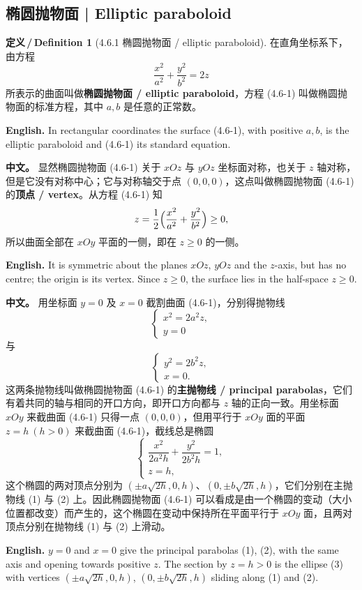 \documentclass[UTF8,11pt,a4paper]{ctexart}
\newcommand{\APS}[2]{\par\noindent\textbf{中文。} #1\par\noindent\textbf{English.} #2\par\smallskip}
\newcommand{\EN}[1]{\par\noindent \textbf{English.} #1\par}
\theoremstyle{definition}
\newtheorem*{definition}{定义\,/\,Definition}
\begin{document}
\subsection{椭圆抛物面 | Elliptic paraboloid}
\begin{definition}[4.6.1 椭圆抛物面 / elliptic paraboloid]\label{def:ell-parab}
在直角坐标系下，由方程
\[
\frac{x^2}{a^2}+\frac{y^2}{b^2}=2z\tag{4.6-1}
\]
所表示的曲面叫做\textbf{椭圆抛物面 / elliptic paraboloid}，方程 (4.6-1) 叫做椭圆抛物面的标准方程，其中 $a,b$ 是任意的正常数。
\EN{In rectangular coordinates the surface (4.6-1), with positive $a,b$, is the elliptic paraboloid and (4.6-1) its standard equation.}
\end{definition}

\APS{显然椭圆抛物面 (4.6-1) 关于 $xOz$ 与 $yOz$ 坐标面对称，也关于 $z$ 轴对称，但是它没有对称中心；它与对称轴交于点 $(0,0,0)$，这点叫做椭圆抛物面 (4.6-1) 的\textbf{顶点 / vertex}。从方程 (4.6-1) 知
\[
z=\frac12\Bigl(\frac{x^2}{a^2}+\frac{y^2}{b^2}\Bigr)\ge 0,
\]
所以曲面全部在 $xOy$ 平面的一侧，即在 $z\ge 0$ 的一侧。}{It is symmetric about the planes $xOz$, $yOz$ and the $z$-axis, but has no centre; the origin is its vertex. Since $z\ge0$, the surface lies in the half-space $z\ge0$.}

\APS{用坐标面 $y=0$ 及 $x=0$ 截割曲面 (4.6-1)，分别得抛物线
\[
\begin{cases}x^2=2a^2z,\\ y=0\end{cases}\tag{1}
\]
与
\[
\begin{cases}y^2=2b^2z,\\ x=0.\end{cases}\tag{2}
\]
这两条抛物线叫做椭圆抛物面 (4.6-1) 的\textbf{主抛物线 / principal parabolas}，它们有着共同的轴与相同的开口方向，即开口方向都与 $z$ 轴的正向一致。用坐标面 $xOy$ 来截曲面 (4.6-1) 只得一点 $(0,0,0)$，但用平行于 $xOy$ 面的平面 $z=h\ (h>0)$ 来截曲面 (4.6-1)，截线总是椭圆
\[
\begin{cases}\dfrac{x^2}{2a^2h}+\dfrac{y^2}{2b^2h}=1,\\ z=h,\end{cases}\tag{3}
\]
这个椭圆的两对顶点分别为 $(\pm a\sqrt{2h},0,h)$、$(0,\pm b\sqrt{2h},h)$，它们分别在主抛物线 (1) 与 (2) 上。因此椭圆抛物面 (4.6-1) 可以看成是由一个椭圆的变动（大小位置都改变）而产生的，这个椭圆在变动中保持所在平面平行于 $xOy$ 面，且两对顶点分别在抛物线 (1) 与 (2) 上滑动。}{$y=0$ and $x=0$ give the principal parabolas (1), (2), with the same axis and opening towards positive $z$. The section by $z=h>0$ is the ellipse (3) with vertices $(\pm a\sqrt{2h},0,h)$, $(0,\pm b\sqrt{2h},h)$ sliding along (1) and (2).}
\end{document}
